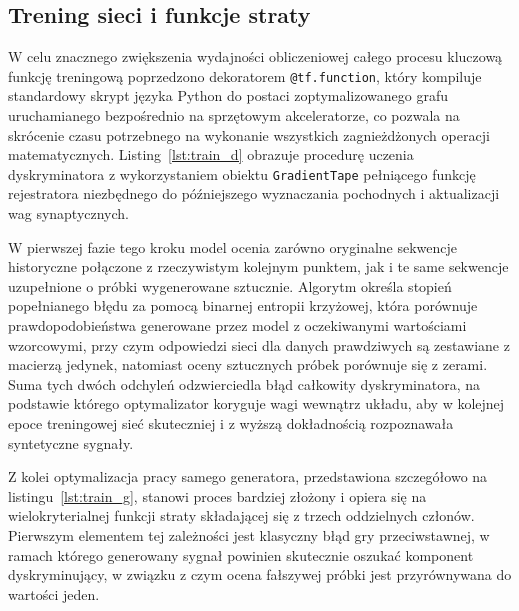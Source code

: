 
 
\subsection{Trening sieci i funkcje straty}
 
W celu znacznego zwiększenia wydajności obliczeniowej całego procesu kluczową funkcję treningową poprzedzono dekoratorem \texttt{@tf.function}, który kompiluje standardowy skrypt języka Python do postaci zoptymalizowanego grafu uruchamianego bezpośrednio na sprzętowym akceleratorze, co pozwala na skrócenie czasu potrzebnego na wykonanie wszystkich zagnieżdżonych operacji matematycznych. Listing~\ref{lst:train_d} obrazuje procedurę uczenia dyskryminatora z wykorzystaniem obiektu \texttt{GradientTape} pełniącego funkcję rejestratora niezbędnego do późniejszego wyznaczania pochodnych i aktualizacji wag synaptycznych.
 
W pierwszej fazie tego kroku model ocenia zarówno oryginalne sekwencje historyczne połączone z rzeczywistym kolejnym punktem, jak i te same sekwencje uzupełnione o próbki wygenerowane sztucznie. Algorytm określa stopień popełnianego błędu za pomocą binarnej entropii krzyżowej, która porównuje prawdopodobieństwa generowane przez model z oczekiwanymi wartościami wzorcowymi, przy czym odpowiedzi sieci dla danych prawdziwych są zestawiane z macierzą jedynek, natomiast oceny sztucznych próbek porównuje się z zerami. 
Suma tych dwóch odchyleń odzwierciedla błąd całkowity dyskryminatora, na podstawie którego optymalizator koryguje wagi wewnątrz układu, aby w kolejnej epoce treningowej sieć skuteczniej i z wyższą dokładnością rozpoznawała syntetyczne sygnały.
 

 
Z kolei optymalizacja pracy samego generatora, przedstawiona szczegółowo na listingu~\ref{lst:train_g}, stanowi proces bardziej złożony i opiera się na wielokryterialnej funkcji straty składającej się z trzech oddzielnych członów. Pierwszym elementem tej zależności jest klasyczny błąd gry przeciwstawnej, w ramach którego generowany sygnał powinien skutecznie oszukać komponent dyskryminujący, w związku z czym ocena fałszywej próbki jest przyrównywana do wartości jeden.
 

